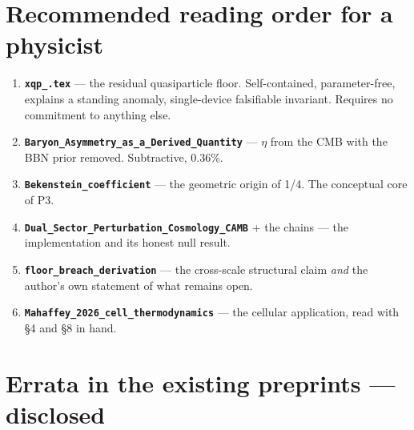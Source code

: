 \documentclass[12pt,a4paper]{article}
\begin{document}
\section{Recommended reading order for a physicist}

\begin{enumerate}\setlength\itemsep{2pt}
  \item \textbf{\texttt{xqp\_.tex}} --- the residual quasiparticle floor. Self-contained, parameter-free, explains a standing anomaly, single-device falsifiable invariant. Requires no commitment to anything else.
  \item \textbf{\texttt{Baryon\_Asymmetry\_as\_a\_Derived\_Quantity}} --- \texttt{$\eta$} from the CMB with the BBN prior removed. Subtractive, 0.36\%.
  \item \textbf{\texttt{Bekenstein\_coefficient}} --- the geometric origin of 1/4. The conceptual core of P3.
  \item \textbf{\texttt{Dual\_Sector\_Perturbation\_Cosmology\_CAMB}} + the chains --- the implementation and its honest null result.
  \item \textbf{\texttt{floor\_breach\_derivation}} --- the cross-scale structural claim \textit{and} the author's own statement of what remains open.
  \item \textbf{\texttt{Mahaffey\_2026\_cell\_thermodynamics}} --- the cellular application, read with \S4 and \S8 in hand.
\end{enumerate}







\section{Errata in the existing preprints --- disclosed}
\end{document}
